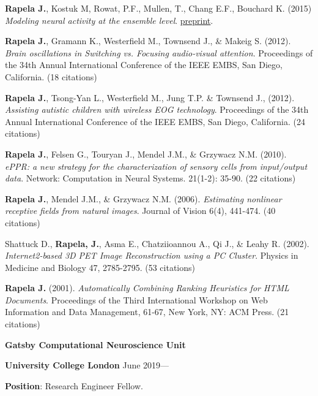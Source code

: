 \documentclass{article}
\begin{document}
\par
\textbf{Rapela J.}, Kostuk M, Rowat, P.F., Mullen, T., Chang E.F., Bouchard K.
(2015)
\textit{Modeling neural activity at the ensemble level}.
\href{http://arxiv.org/abs/1505.00041}{preprint}.

\par
\textbf{Rapela J.}, Gramann K., Westerfield M., Townsend J., \& Makeig S.
(2012).  \textit{Brain oscillations in Switching vs. Focusing audio-visual
attention}.  Proceedings of the 34th Annual International Conference of the
IEEE EMBS, San Diego, California. (18 citations)

\par
\textbf{Rapela J.}, Tsong-Yan L., Westerfield M., Jung T.P. \& Townsend J.,
(2012).  \textit{Assisting autistic children with wireless EOG technology}.
Proceedings of the 34th Annual International Conference of the IEEE EMBS, San
Diego, California. (24 citations)

\par
\textbf{Rapela J.}, Felsen G., Touryan J., Mendel J.M., \& Grzywacz N.M. (2010).
\textit{ePPR: a new strategy for the characterization of sensory cells from input/output data}.
Network: Computation in Neural Systems. 21(1-2): 35-90. (22 citations)

\par
\textbf{Rapela J.}, Mendel J.M., \& Grzywacz N.M. (2006).
\textit{Estimating nonlinear receptive fields from natural images}.
Journal of Vision 6(4), 441-474. (40 citations)

\par
Shattuck D., \textbf{Rapela, J.}, Asma E., Chatziioannou A., Qi J., \& Leahy R. (2002).
\textit{Internet2-based 3D PET Image Reconstruction using a PC Cluster}.
Physics in Medicine and Biology 47, 2785-2795. (53 citations)

\par
\textbf{Rapela J.} (2001).
\textit{Automatically Combining Ranking Heuristics for HTML Documents}.
Proceedings of the Third International Workshop on Web Information and Data
Management, 61-67, New York, NY: ACM Press. (21 citations)

\par
\vspace{2\baselineskip}
{\bf Gatsby Computational Neuroscience Unit}
\par
{\bf University College London} \hspace*{\fill} June 2019---
\par
{\bf Position}: Research Engineer Fellow.
\par
\end{document}
